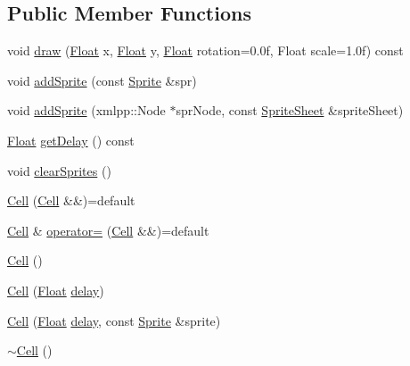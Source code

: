 \subsection*{Public Member Functions}
\begin{DoxyCompactItemize}
\item 
void \hyperlink{classZeta_1_1Cell_ad9f006fa7d204493878e288f1ba35b75}{draw} (\hyperlink{namespaceZeta_a1e0a1265f9b3bd3075fb0fabd39088ba}{Float} x, \hyperlink{namespaceZeta_a1e0a1265f9b3bd3075fb0fabd39088ba}{Float} y, \hyperlink{namespaceZeta_a1e0a1265f9b3bd3075fb0fabd39088ba}{Float} rotation=0.\+0f, Float scale=1.\+0f) const 
\item 
void \hyperlink{classZeta_1_1Cell_ae2d0f2242819da0a814872d19333ebc4}{add\+Sprite} (const \hyperlink{classZeta_1_1Cell_1_1Sprite}{Sprite} \&spr)
\item 
void \hyperlink{classZeta_1_1Cell_a79565540268e51b526f6f9cae67d443c}{add\+Sprite} (xmlpp\+::\+Node $\ast$spr\+Node, const \hyperlink{classZeta_1_1SpriteSheet}{Sprite\+Sheet} \&sprite\+Sheet)
\item 
\hyperlink{namespaceZeta_a1e0a1265f9b3bd3075fb0fabd39088ba}{Float} \hyperlink{classZeta_1_1Cell_a6b6b39710a29aeacf0a8546044bb0abb}{get\+Delay} () const 
\item 
void \hyperlink{classZeta_1_1Cell_a3c6553cf74e7ea8f6e6a44371fe244aa}{clear\+Sprites} ()
\item 
\hyperlink{classZeta_1_1Cell_a96ba2d0bcbd286fb3c2921f100bb769a}{Cell} (\hyperlink{classZeta_1_1Cell}{Cell} \&\&)=default
\item 
\hyperlink{classZeta_1_1Cell}{Cell} \& \hyperlink{classZeta_1_1Cell_a6d143f1384be8587876e13f825d6fb5f}{operator=} (\hyperlink{classZeta_1_1Cell}{Cell} \&\&)=default
\item 
\hyperlink{classZeta_1_1Cell_a8fdaa0f6790d19175af373611ac93dfc}{Cell} ()
\item 
\hyperlink{classZeta_1_1Cell_a319638156f2ebb8c12148036a756ed3b}{Cell} (\hyperlink{namespaceZeta_a1e0a1265f9b3bd3075fb0fabd39088ba}{Float} \hyperlink{classZeta_1_1Cell_a04e89b75d1e55f552f18b0b99d5340ae}{delay})
\item 
\hyperlink{classZeta_1_1Cell_a24e7d7a65465d35eb418c8ac80166f65}{Cell} (\hyperlink{namespaceZeta_a1e0a1265f9b3bd3075fb0fabd39088ba}{Float} \hyperlink{classZeta_1_1Cell_a04e89b75d1e55f552f18b0b99d5340ae}{delay}, const \hyperlink{classZeta_1_1Cell_1_1Sprite}{Sprite} \&sprite)
\item 
\hyperlink{classZeta_1_1Cell_aa31e8a72a07450e3f2d18d5fdced5463}{$\sim$\+Cell} ()
\end{DoxyCompactItemize}
